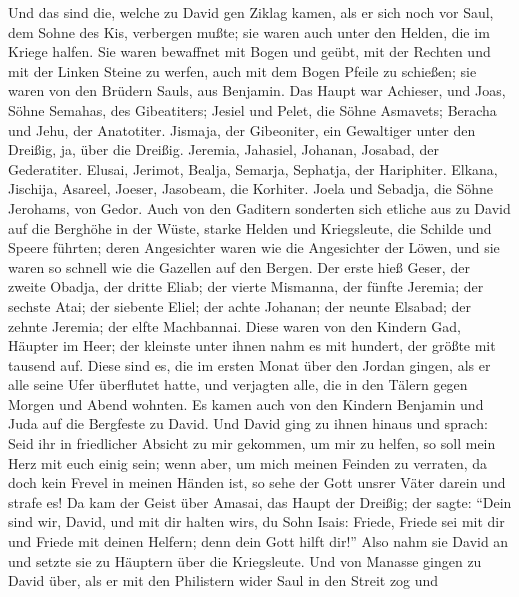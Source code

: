  Und das sind die, welche zu David gen Ziklag kamen, als
er sich noch vor Saul, dem Sohne des Kis, verbergen mußte; sie waren
auch unter den Helden, die im Kriege halfen.  Sie waren
bewaffnet mit Bogen und geübt, mit der Rechten und mit der Linken Steine
zu werfen, auch mit dem Bogen Pfeile zu schießen; sie waren von den
Brüdern Sauls, aus Benjamin.  Das Haupt war Achieser, und
Joas, Söhne Semahas, des Gibeatiters; Jesiel und Pelet, die Söhne
Asmavets; Beracha und Jehu, der Anatotiter.  Jismaja, der
Gibeoniter, ein Gewaltiger unter den Dreißig, ja, über die Dreißig.
Jeremia, Jahasiel, Johanan, Josabad, der Gederatiter. 
Elusai, Jerimot, Bealja, Semarja, Sephatja, der Hariphiter.
 Elkana, Jischija, Asareel, Joeser, Jasobeam, die
Korhiter.  Joela und Sebadja, die Söhne Jerohams, von
Gedor.  Auch von den Gaditern sonderten sich etliche aus
zu David auf die Berghöhe in der Wüste, starke Helden und Kriegsleute,
die Schilde und Speere führten; deren Angesichter waren wie die
Angesichter der Löwen, und sie waren so schnell wie die Gazellen auf den
Bergen.  Der erste hieß Geser, der zweite Obadja, der
dritte Eliab;  der vierte Mismanna, der fünfte Jeremia;
 der sechste Atai; der siebente Eliel; 
der achte Johanan; der neunte Elsabad;  der zehnte
Jeremia; der elfte Machbannai.  Diese waren von den
Kindern Gad, Häupter im Heer; der kleinste unter ihnen nahm es mit
hundert, der größte mit tausend auf.  Diese sind es, die
im ersten Monat über den Jordan gingen, als er alle seine Ufer
überflutet hatte, und verjagten alle, die in den Tälern gegen Morgen und
Abend wohnten.  Es kamen auch von den Kindern Benjamin
und Juda auf die Bergfeste zu David.  Und David ging zu
ihnen hinaus und sprach: Seid ihr in friedlicher Absicht zu mir
gekommen, um mir zu helfen, so soll mein Herz mit euch einig sein; wenn
aber, um mich meinen Feinden zu verraten, da doch kein Frevel in meinen
Händen ist, so sehe der Gott unsrer Väter darein und strafe es!
 Da kam der Geist über Amasai, das Haupt der Dreißig; der
sagte: ``Dein sind wir, David, und mit dir halten wir\textquotesingle s,
du Sohn Isais: Friede, Friede sei mit dir und Friede mit deinen Helfern;
denn dein Gott hilft dir!'' Also nahm sie David an und setzte sie zu
Häuptern über die Kriegsleute.  Und von Manasse gingen zu
David über, als er mit den Philistern wider Saul in den Streit zog und
